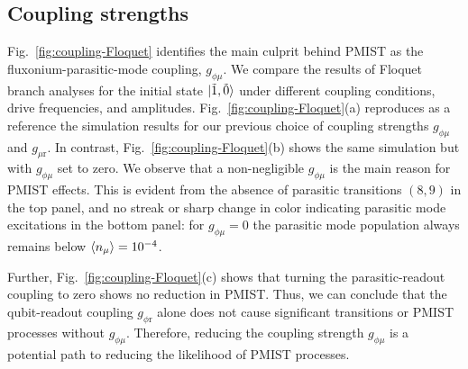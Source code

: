 \documentclass[%
reprint,
superscriptaddress,
 amsmath,amssymb,
 aps,
 prx,
longbibliography,
floatfix,
]{revtex4-2}
\begin{document}
\subsection{Coupling strengths} \label{sec:coupling}

Fig.~\ref{fig:coupling-Floquet} identifies the main culprit behind PMIST as the fluxonium-parasitic-mode coupling, $g_{\phi \mu}$. We compare the results of Floquet branch analyses for the initial state $\ket{\tilde{1}, \tilde{0}}$ under different coupling conditions, drive frequencies, and amplitudes. Fig.~\ref{fig:coupling-Floquet}(a) reproduces as a reference the simulation results for our previous choice of coupling strengths $g_{\phi\mu}$ and $g_{\mu \textrm{r}}$. In contrast, Fig.~\ref{fig:coupling-Floquet}(b) shows the same simulation but with $g_{\phi \mu}$ set to zero. We observe that a non-negligible $g_{\phi\mu}$ is the main reason for PMIST effects. This is evident from the absence of parasitic transitions $(8,9)$ in the top panel, and no streak or sharp change in color indicating parasitic mode excitations in the bottom panel: for $g_{\phi \mu}=0$ the parasitic mode population always remains below $\braket{n_\mu}=10^{-4}$.

Further, Fig.~\ref{fig:coupling-Floquet}(c) shows that turning the parasitic-readout coupling to zero shows no reduction in PMIST. Thus, we can conclude that the qubit-readout coupling $g_{\phi \textrm{r}}$ alone does not cause significant transitions or PMIST processes without $g_{\phi \mu}$. Therefore, reducing the coupling strength $g_{\phi \mu}$ is a potential path to reducing the likelihood of PMIST processes.
\end{document}
